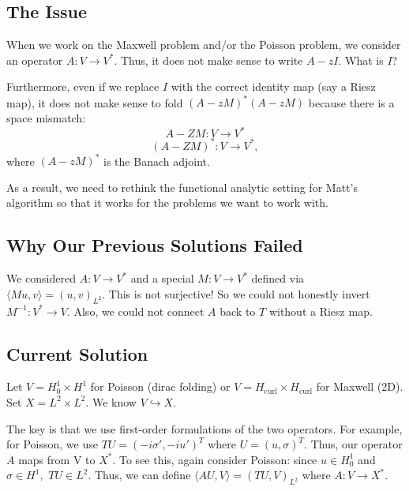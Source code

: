 \documentclass[12pt,a4paper]{article}
\begin{document}
\subsection{The Issue}

When we work on the Maxwell problem and/or the Poisson problem, we consider an operator $A : V \rightarrow V^*.$ Thus, it does not make sense to write $A-zI.$ What is $I$?

Furthermore, even if we replace $I$ with the correct identity map (say a Riesz map), it does not make sense to fold $(A-zM)^*(A-zM)$ because there is a space mismatch:
\begin{equation}
    A-ZM : V \rightarrow V^*
\end{equation}
\begin{equation}
    (A-ZM)^* : V \rightarrow V^*,
\end{equation}
where $(A-zM)^*$ is the Banach adjoint. 

As a result, we need to rethink the functional analytic setting for Matt's algorithm so that it works for the problems we want to work with.

\subsection{Why Our Previous Solutions Failed}

We considered $A : V \rightarrow V^*$ and a special $M: V \rightarrow V^*$ defined via $\langle Mu, v\rangle = (u, v)_{L^2}.$ This is not surjective! So we could not honestly invert $M^{-1}:V^* \rightarrow V.$ Also, we could not connect $A$ back to $T$ without a Riesz map. 

\subsection{Current Solution}

Let $V = H_0^1 \times H^1$ for Poisson (dirac folding) or $V = H_{\text{curl}} \times H_{\text{curl}} $ for Maxwell (2D). Set $X = L^2 \times L^2.$ We know $V \hookrightarrow X.$

The key is that we use first-order formulations of the two operators. For example, for Poisson, we use $TU = (-i \sigma', -i u')^T$ where $U = (u, \sigma)^T.$ Thus, our operator $A$ maps from V to $X^*.$ To see this, again consider Poisson: since $u \in H_0^1$ and $\sigma \in H^1,$ $TU \in L^2.$ Thus, we can define $\langle AU, V \rangle = (TU, V)_{L^2}$ where $A : V \rightarrow X^*.$
\end{document}
